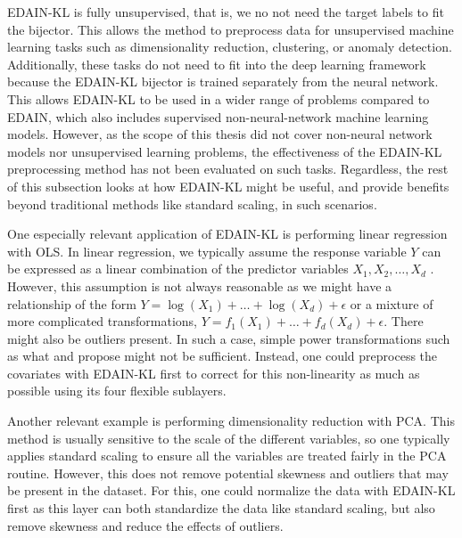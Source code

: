 \documentclass{statsmsc}
\begin{document}
{%
\ac{EDAIN-KL} is fully unsupervised, that is,
we no not need the target labels  to fit the bijector. This
allows the method to preprocess data for unsupervised machine learning tasks
such as dimensionality reduction, clustering, or anomaly detection.
Additionally, these tasks do not need to fit into the deep learning
framework because the \ac{EDAIN-KL} bijector is trained separately from
the neural network. This allows \ac{EDAIN-KL} to be used
in a wider range of problems compared to \ac{EDAIN}, which also includes supervised
non-neural-network machine learning models.
However, as the scope of this thesis did not cover non-neural network models
nor unsupervised learning problems, the effectiveness of the \ac{EDAIN-KL}
preprocessing method has not been evaluated on such tasks. 
Regardless, the rest of this subsection looks at how \ac{EDAIN-KL} might be useful,
and provide benefits beyond traditional methods like standard scaling,
in such scenarios.

One especially relevant application of \ac{EDAIN-KL} is performing linear regression with
\ac{OLS}.
%
In linear regression, we typically assume the response variable $Y$ can be expressed as a linear
combination of the predictor variables $X_1,X_2,\dots,X_d$ \citep{wasserman}. However, this
assumption is not always reasonable as we might have a relationship of the form
$Y=\log(X_1)+\dots+\log(X_d)+\epsilon$ or a mixture of more complicated transformations,
$Y=f_1(X_1)+\dots+f_d(X_d)+\epsilon$.
There might also be outliers present. In such a case,
simple power transformations such as what \cite{boxcox} and \cite{yeoJohnson} propose
might not be sufficient. Instead, one could preprocess the covariates with \ac{EDAIN-KL} first
to correct for this non-linearity as much as possible using its four flexible sublayers.

Another relevant example is
performing dimensionality reduction with \ac{PCA}. This method is usually sensitive to the
scale of the different variables, so one typically applies standard scaling to ensure all the
variables are treated fairly in the \ac{PCA} routine. However, this does not remove potential
skewness
and outliers that may be present in the dataset. For this, one could normalize the data with
\ac{EDAIN-KL} first as this layer can both standardize the data like standard scaling, but
also remove skewness and reduce the effects of outliers.

}
\end{document}
